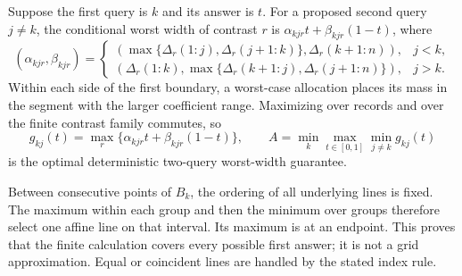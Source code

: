 \documentclass[12pt]{article}
\begin{document}
Suppose the first query is $k$ and its answer is $t$.  For a proposed
second query $j\ne k$, the conditional worst width of contrast $r$ is
$\alpha_{kjr}t+\beta_{kjr}(1-t)$, where
\[
 (\alpha_{kjr},\beta_{kjr})=
 \begin{cases}
 (\max\{\Delta_r(1{:}j),\Delta_r(j+1{:}k)\},
             \Delta_r(k+1{:}n)),&j<k,\\
 (\Delta_r(1{:}k),
       \max\{\Delta_r(k+1{:}j),\Delta_r(j+1{:}n)\}),&j>k.
 \end{cases}
\]
Within each side of the first boundary, a worst-case allocation places
its mass in the segment with the larger coefficient range.  Maximizing
over records and over the finite contrast family commutes, so
\[
 g_{kj}(t)=\max_r\{\alpha_{kjr}t+\beta_{kjr}(1-t)\},\qquad
 A=\min_k\max_{t\in[0,1]}\min_{j\ne k}g_{kj}(t)
\]
is the optimal deterministic two-query worst-width guarantee.

\begin{center}
\end{center}

Between consecutive points of $B_k$, the ordering of all underlying lines
is fixed.  The maximum within each group and then the minimum over groups
therefore select one affine line on that interval.  Its maximum is at an
endpoint.  This proves that the finite calculation covers every possible
first answer; it is not a grid approximation.  Equal or coincident lines
are handled by the stated index rule.
\end{document}

